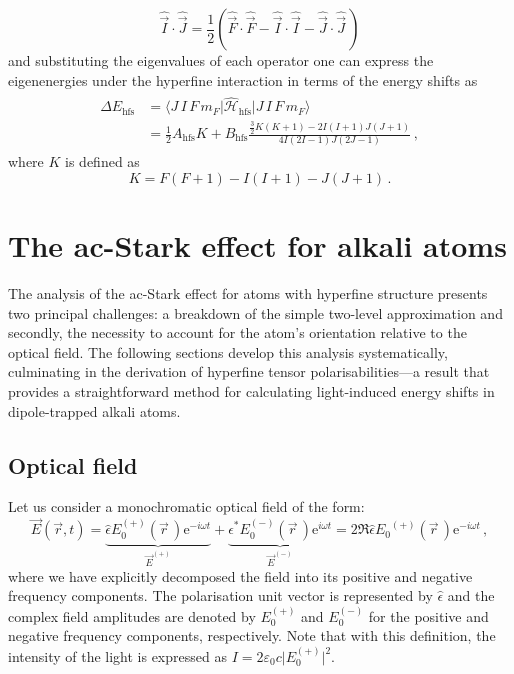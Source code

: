 \documentclass[../Thesis-IJspeert.tex]{subfiles}
\begin{document}
\begin{equation}
\hat{\vec{I}} \cdot \hat{\vec{J}} = \frac{1}{2}\left(\hat{\vec{F}} \cdot \hat{\vec{F}} - \hat{\vec{I}} \cdot \hat{\vec{I}} - \hat{\vec{J}} \cdot \hat{\vec{J}}\,\right)
\end{equation}
and substituting the eigenvalues of each operator one can express the eigenenergies under the hyperfine interaction in terms of the energy shifts as
\begin{align}
\begin{split}
\Delta E_{\mathrm{hfs}}&= \langle J\, I\, F\, m_F \vert \hat{\mathcal{H}}_{\mathrm{hfs}} \vert J\, I\, F\, m_F \rangle\\ &= \frac{1}{2} A_{\mathrm{hfs}} K+B_{\mathrm{hfs}} \frac{\frac{3}{2} K(K+1)-2 I(I+1) J(J+1)}{4 I(2 I-1) J(2 J-1)} \,,
\end{split}
\end{align}
where $K$ is defined as
\begin{equation}
K = F(F+1)- I(I+1) - J(J+1) \,.
\end{equation}

\section[The ac-Stark effect for alkali atoms]{The ac-Stark effect for alkali atoms}
\label{acstark}
The analysis of the ac-Stark effect for atoms with hyperfine structure presents two principal challenges: a breakdown of the simple two-level approximation and secondly, the necessity to account for the atom's orientation relative to the optical field. The following sections develop this analysis systematically, culminating in the derivation of hyperfine tensor polarisabilities---a result that provides a straightforward method for calculating light-induced energy shifts in dipole-trapped alkali atoms.

\subsection{Optical field}
Let us consider a monochromatic optical field of the form:
\begin{equation}
\label{Efield}
\vec{E}(\vec{r},t) = \underbrace{\hat{\epsilon}E_0^{(+)}(\vec{r}\,) \mathrm{e}^{-i\omega t}}_{\vec{E}^{(+)}} +  \underbrace{\hat{\epsilon}^*E_0^{(-)}(\vec{r}\,) \mathrm{e}^{i\omega t}}_{\vec{E}^{(-)}} =  2\Re {\hat{\epsilon}{E_0}^{(+)}(\vec{r}\,) \mathrm{e}^{-i\omega t} } \,,
\end{equation}
where we have explicitly decomposed the field into its positive and negative frequency components. The polarisation unit vector is represented by $\hat{\epsilon}$ and the complex field amplitudes are denoted by $E_0^{(+)}$ and $E_0^{(-)}$ for the positive and negative frequency components, respectively. Note that with this definition, the intensity of the light is expressed as $I=2\varepsilon_0 c \vert E_0^{(+)}\vert ^2$.
\end{document}

